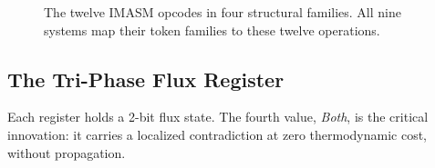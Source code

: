\documentclass[12pt,a4paper]{article}
\begin{document}
\begin{figure}[htbp]
\caption{The twelve IMASM opcodes in four structural families. All nine systems map their token families to these twelve operations.}
\label{fig:taxonomy}
\end{figure}

\subsection{The Tri-Phase Flux Register}

Each register holds a 2-bit flux state. The fourth value, \emph{Both}, is the critical innovation: it carries a localized contradiction at zero thermodynamic cost, without propagation.
\end{document}
